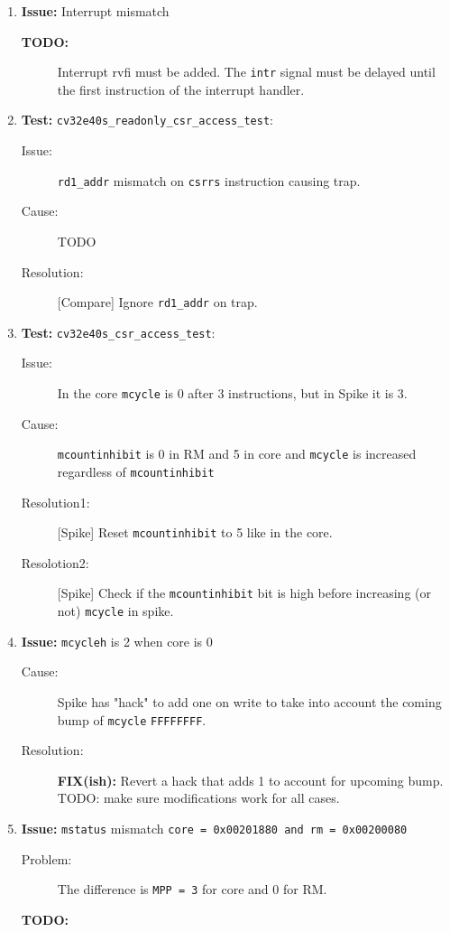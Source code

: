 \begin{enumerate}
\item \textbf{Issue:} Interrupt mismatch
  \begin{description}
    \item[\textbf{TODO:}] Interrupt rvfi must be added. The \lstinline{intr} signal must be delayed until the first instruction of the interrupt handler.
  \end{description}

\item \textbf{Test:} \lstinline{cv32e40s_readonly_csr_access_test}:
  \begin{description}
    \item[Issue:] \lstinline{rd1_addr} mismatch on \lstinline{csrrs} instruction causing trap.
    \item[Cause:] TODO
    \item[Resolution:] [Compare] Ignore \lstinline{rd1_addr} on trap.
  \end{description}

\item \textbf{Test:} \lstinline{cv32e40s_csr_access_test}:
  \begin{description}
    \item[Issue:] In the core \lstinline{mcycle} is 0 after 3 instructions, but in Spike it is 3.
    \item[Cause:] \lstinline{mcountinhibit} is 0 in RM and 5 in core and \lstinline{mcycle} is increased regardless of \lstinline{mcountinhibit}
    \item[Resolution1:] [Spike] Reset \lstinline{mcountinhibit} to 5 like in the core.
    \item[Resolotion2:] [Spike] Check if the \lstinline{mcountinhibit} bit is high before increasing (or not) \lstinline{mcycle} in spike.
  \end{description}

\item \textbf{Issue:} \lstinline{mcycleh} is 2 when core is 0
  \begin{description}
    \item[Cause:] Spike has "hack" to add one on write to take into account the coming bump of \lstinline{mcycle} \texttt{FFFFFFFF}.
    \item[Resolution:] \textbf{FIX(ish):} Revert a hack that adds 1 to account for upcoming bump. TODO: make sure modifications work for all cases.
  \end{description}

\item \textbf{Issue:} \lstinline{mstatus} mismatch \lstinline{core = 0x00201880 and rm = 0x00200080}
  \begin{description}
    \item[Problem:] The difference is \lstinline{MPP = 3} for core and 0 for RM.
    \item[\textbf{TODO:}] 
  \end{description}
  

\end{enumerate}
